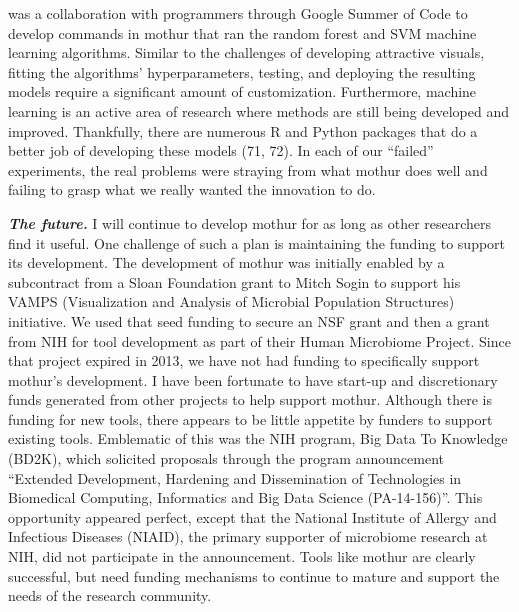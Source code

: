 \documentclass[11pt,]{article}
\begin{document}
was a collaboration with programmers through Google Summer of Code to
develop commands in mothur that ran the random forest and SVM machine
learning algorithms. Similar to the challenges of developing attractive
visuals, fitting the algorithms' hyperparameters, testing, and deploying
the resulting models require a significant amount of customization.
Furthermore, machine learning is an active area of research where
methods are still being developed and improved. Thankfully, there are
numerous R and Python packages that do a better job of developing these
models (71, 72). In each of our ``failed'' experiments, the real
problems were straying from what mothur does well and failing to grasp
what we really wanted the innovation to do.

\textbf{\emph{The future.}} I will continue to develop mothur for as
long as other researchers find it useful. One challenge of such a plan
is maintaining the funding to support its development. The development
of mothur was initially enabled by a subcontract from a Sloan Foundation
grant to Mitch Sogin to support his VAMPS (Visualization and Analysis of
Microbial Population Structures) initiative. We used that seed funding
to secure an NSF grant and then a grant from NIH for tool development as
part of their Human Microbiome Project. Since that project expired in
2013, we have not had funding to specifically support mothur's
development. I have been fortunate to have start-up and discretionary
funds generated from other projects to help support mothur. Although
there is funding for new tools, there appears to be little appetite by
funders to support existing tools. Emblematic of this was the NIH
program, Big Data To Knowledge (BD2K), which solicited proposals through
the program announcement ``Extended Development, Hardening and
Dissemination of Technologies in Biomedical Computing, Informatics and
Big Data Science (PA-14-156)''. This opportunity appeared perfect,
except that the National Institute of Allergy and Infectious Diseases
(NIAID), the primary supporter of microbiome research at NIH, did not
participate in the announcement. Tools like mothur are clearly
successful, but need funding mechanisms to continue to mature and
support the needs of the research community.
\end{document}
